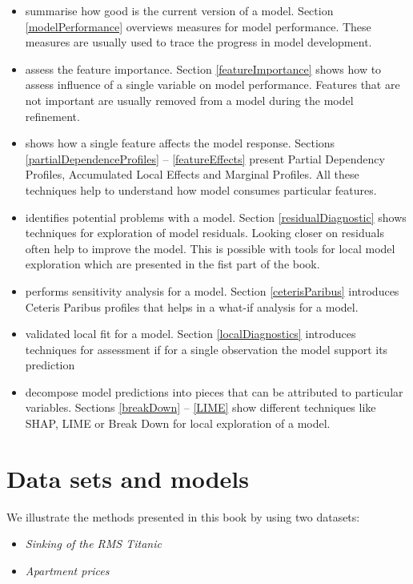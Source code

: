 \documentclass[12pt,]{krantz}
\providecommand{\tightlist}{%
  \setlength{\itemsep}{0pt}\setlength{\parskip}{0pt}}
\begin{document}
\begin{itemize}
\tightlist
\item
  summarise how good is the current version of a model. Section \ref{modelPerformance} overviews measures for model performance. These measures are usually used to trace the progress in model development.
\item
  assess the feature importance. Section \ref{featureImportance} shows how to assess influence of a single variable on model performance. Features that are not important are usually removed from a model during the model refinement.
\item
  shows how a single feature affects the model response. Sections \ref{partialDependenceProfiles} -- \ref{featureEffects} present Partial Dependency Profiles, Accumulated Local Effects and Marginal Profiles. All these techniques help to understand how model consumes particular features.
\item
  identifies potential problems with a model. Section \ref{residualDiagnostic} shows techniques for exploration of model residuals. Looking closer on residuals often help to improve the model. This is possible with tools for local model exploration which are presented in the fist part of the book.
\item
  performs sensitivity analysis for a model. Section \ref{ceterisParibus} introduces Ceteris Paribus profiles that helps in a what-if analysis for a model.
\item
  validated local fit for a model. Section \ref{localDiagnostics} introduces techniques for assessment if for a single observation the model support its prediction
\item
  decompose model predictions into pieces that can be attributed to particular variables. Sections \ref{breakDown} -- \ref{LIME} show different techniques like SHAP, LIME or Break Down for local exploration of a model.
\end{itemize}

\hypertarget{dataSetsIntro}{%
\section{Data sets and models}\label{dataSetsIntro}}

We illustrate the methods presented in this book by using two datasets:

\begin{itemize}
\tightlist
\item
  \emph{Sinking of the RMS Titanic}
\item
  \emph{Apartment prices}
\end{itemize}
\end{document}
